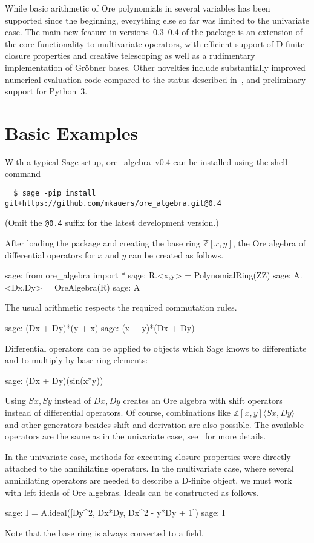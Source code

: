 \documentclass[11pt]{article}
\def\<#1>{\langle#1\rangle}
\let\set\mathbb
\begin{document}
While basic arithmetic of Ore polynomials in several variables has been supported since the
beginning, everything else so far was limited to the univariate case.
The main new feature in versions~0.3--0.4 of the package is an extension of the core
functionality to multivariate operators, with efficient support of D-finite closure properties and
creative telescoping as well as a rudimentary implementation of Gr\"obner bases.
Other novelties include substantially improved numerical evaluation code compared to the status
described in~\cite{mezzarobba16}, and preliminary support for Python~3.

\section{Basic Examples}

With a typical Sage setup, ore\_algebra~v0.4 can be installed using the shell command
\begin{verbatim}
  $ sage -pip install git+https://github.com/mkauers/ore_algebra.git@0.4
\end{verbatim}
(Omit the \verb!@0.4! suffix for the latest development version.)

After loading the package and creating the base ring $\set Z[x,y]$, the Ore algebra of differential
operators for $x$ and $y$ can be created as follows. 
\begin{sageexample}
  sage: from ore_algebra import *
  sage: R.<x,y> = PolynomialRing(ZZ)
  sage: A.<Dx,Dy> = OreAlgebra(R)
  sage: A
\end{sageexample}
The usual arithmetic respects the required commutation rules. 
\begin{sageexample}
  sage: (Dx + Dy)*(y + x)
  sage: (x + y)*(Dx + Dy)
\end{sageexample}
Differential operators can be applied to objects which Sage knows to differentiate and to multiply
by base ring elements:
\begin{sageexample}
  sage: (Dx + Dy)(sin(x*y))
\end{sageexample}
Using $Sx,Sy$ instead of $Dx,Dy$ creates an Ore algebra with shift operators instead of differential operators.
Of course, combinations like $\set Z[x,y]\<Sx,Dy>$ and other generators besides shift and derivation are also possible.
The available operators are the same as in the univariate case, see~\cite{kauers14b} for more details.

In the univariate case, methods for executing closure properties were directly attached to the annihilating operators.
In the multivariate case, where several annihilating operators are needed to describe a D-finite object, we must work
with left ideals of Ore algebras. Ideals can be constructed as follows.
\begin{sageexample}
  sage: I = A.ideal([Dy^2, Dx*Dy, Dx^2 - y*Dy + 1])
  sage: I
\end{sageexample}
Note that the base ring is always converted to a field.
\end{document}

